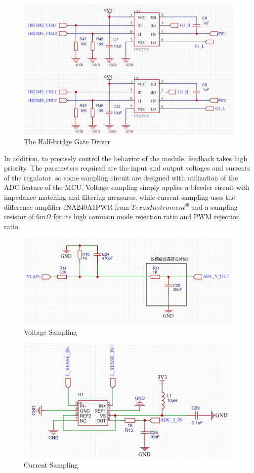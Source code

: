 \documentclass[a4paper,num-refs]{oup-contemporary}
\begin{document}
\begin{figure}[h]
	\centering
	\includegraphics[width=0.6\linewidth]{GateDriver.png}
	\caption{The Half-bridge Gate Driver}
\end{figure} 

In addition, to precisely control the behavior of the module, feedback takes high priority. The parameters required are the input and output voltages and currents of the regulator, so some sampling circuit are designed with utilization of the ADC feature of the MCU. Voltage sampling simply applies a bleeder circuit with impedance matching and filtering measures, while current sampling uses the difference amplifier INA240A1PWR from $ Texas Instrument^{\circledR} $ and a sampling resistor of $ 6m\Omega $ for its high common mode rejection ratio and PWM rejection ratio.

\begin{figure}[h]
	\centering
	\includegraphics[width=0.6\linewidth]{VoltageSampling.png}
	\caption{Voltage Sampling}
\end{figure} 

\begin{figure}[h]
	\centering
	\includegraphics[width=0.7\linewidth]{CurrentSampling.png}
	\caption{Current Sampling}
\end{figure} 
\end{document}
